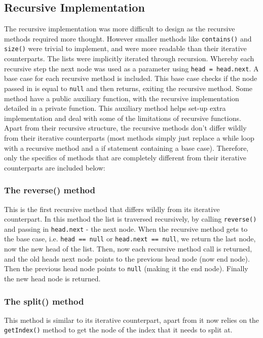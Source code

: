 \documentclass{article}
\begin{document}
\subsection{Recursive Implementation}
The recursive implementation was more difficult to design as the recursive methods required more thought. However smaller methods like \verb+contains()+ and \verb+size()+ were trivial to implement, and were more readable than their iterative counterparts. The lists were implicitly iterated through recursion. Whereby each recursive step the next node was used as a parameter using \verb+head = head.next+. A base case for each recursive method is included. This base case checks if the node passed in is equal to \verb+null+ and then returns, exiting the recursive method. Some method have a public auxiliary function, with the recursive implementation detailed in a private function. This auxiliary method helps set-up extra implementation and deal with some of the limitations of recursive functions. \\

\noindent Apart from their recursive structure, the recursive methods don't differ wildly from their iterative counterparts (most methods simply just replace a while loop with a recursive method and a if statement containing a base case). Therefore, only the specifics of methods that are completely different from their iterative counterparts are included below:

\subsubsection{The reverse() method}
This is the first recursive method that differs wildly from its iterative counterpart. In this method the list is traversed recursively, by calling \verb+reverse()+ and passing in \verb+head.next+ - the next node. When the recursive method gets to the base case, i.e. \verb+head == null+ or \verb+head.next == null+, we return the last node, now the new head of the list. Then, now each recursive method call is returned, and the old heads next node points to the previous head node (now end node). Then the previous head node points to \verb+null+ (making it the end node). Finally the new head node is returned.

\subsubsection{The split() method}
This method is similar to its iterative counterpart, apart from it now relies on the \verb+getIndex()+ method to get the node of the index that it needs to split at.
\end{document}
